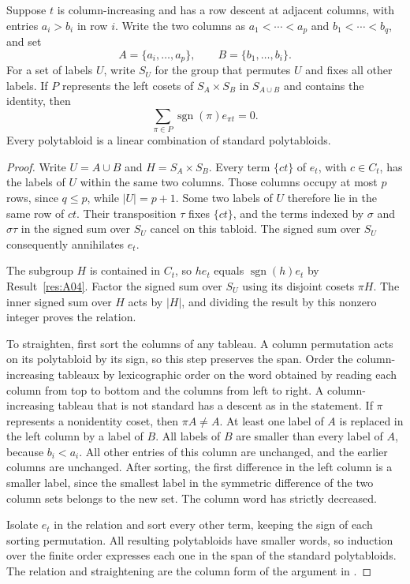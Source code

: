 \begin{proposition}\label{res:B02}
Suppose \(t\) is column-increasing and has a row descent at adjacent
columns, with entries \(a_i>b_i\) in row \(i\). Write the two columns
as \(a_1<\cdots<a_p\) and \(b_1<\cdots<b_q\), and set
\[
  A=\{a_i,\ldots,a_p\},\qquad B=\{b_1,\ldots,b_i\}.
\]
For a set of labels \(U\), write \(S_U\) for the group that permutes
\(U\) and fixes all other labels. If \(P\) represents the left cosets
of \(S_A\times S_B\) in \(S_{A\cup B}\) and contains the identity, then
\[
  \sum_{\pi\in P}\operatorname{sgn}(\pi)e_{\pi t}=0.
\]
Every polytabloid is a linear combination of standard polytabloids.
\end{proposition}

\begin{proof}
Write \(U=A\cup B\) and \(H=S_A\times S_B\). Every term \(\{ct\}\)
of \(e_t\), with \(c\in C_t\), has the labels of \(U\) within the
same two columns. Those columns occupy at most \(p\) rows, since
\(q\le p\), while \(\lvert U\rvert=p+1\). Some two labels of \(U\)
therefore lie in the same row of \(ct\). Their transposition \(\tau\)
fixes \(\{ct\}\), and the terms indexed by \(\sigma\) and
\(\sigma\tau\) in the signed sum over \(S_U\) cancel on this tabloid.
The signed sum over \(S_U\) consequently annihilates \(e_t\).

The subgroup \(H\) is contained in \(C_t\), so \(h e_t\)
equals \(\operatorname{sgn}(h)e_t\) by Result~\ref{res:A04}. Factor the
signed sum over \(S_U\) using its disjoint cosets \(\pi H\). The inner
signed sum over \(H\) acts by \(\lvert H\rvert\), and dividing the
result by this nonzero integer proves the relation.

To straighten, first sort the columns of any tableau. A column
permutation acts on its polytabloid by its sign, so this step preserves
the span. Order the column-increasing tableaux by lexicographic order
on the word obtained by reading each column from top to bottom and
the columns from left to right. A column-increasing tableau that is
not standard has a descent as in the statement. If \(\pi\) represents
a nonidentity coset, then \(\pi A\ne A\). At least one label of \(A\)
is replaced in the left column by a label of \(B\). All labels of
\(B\) are smaller than every label of \(A\), because \(b_i<a_i\).
All other entries of this column are unchanged, and the earlier
columns are unchanged. After sorting, the first difference in the
left column is a smaller label, since the smallest label in the
symmetric difference of the two column sets belongs to the new set.
The column word has strictly decreased.

Isolate \(e_t\) in the relation and sort every other term, keeping the
sign of each sorting permutation. All resulting polytabloids have
smaller words, so induction over the finite order expresses each one
in the span of the standard polytabloids. The relation and
straightening are the column form of the argument in
\cite[Section 2.6, Proposition 2.6.3 and Theorem 2.6.4]{sagan}.
\end{proof}

